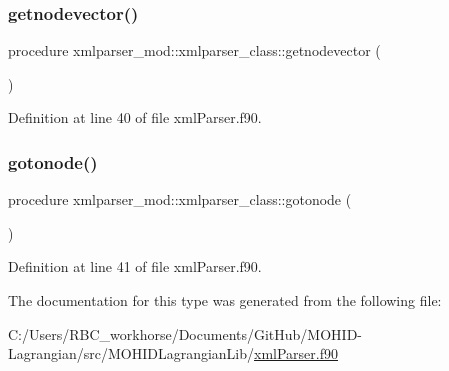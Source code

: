\subsubsection{\texorpdfstring{getnodevector()}{getnodevector()}}
{\footnotesize\ttfamily procedure xmlparser\+\_\+mod\+::xmlparser\+\_\+class\+::getnodevector (\begin{DoxyParamCaption}{ }\end{DoxyParamCaption})\hspace{0.3cm}{\ttfamily [private]}}



Definition at line 40 of file xml\+Parser.\+f90.

\mbox{\label{structxmlparser__mod_1_1xmlparser__class_ab8393d12a17d3409c136cdf29d0463b2}} 
\subsubsection{\texorpdfstring{gotonode()}{gotonode()}}
{\footnotesize\ttfamily procedure xmlparser\+\_\+mod\+::xmlparser\+\_\+class\+::gotonode (\begin{DoxyParamCaption}{ }\end{DoxyParamCaption})\hspace{0.3cm}{\ttfamily [private]}}



Definition at line 41 of file xml\+Parser.\+f90.



The documentation for this type was generated from the following file\+:\begin{DoxyCompactItemize}
\item 
C\+:/\+Users/\+R\+B\+C\+\_\+workhorse/\+Documents/\+Git\+Hub/\+M\+O\+H\+I\+D-\/\+Lagrangian/src/\+M\+O\+H\+I\+D\+Lagrangian\+Lib/\mbox{\hyperlink{xml_parser_8f90}{xml\+Parser.\+f90}}\end{DoxyCompactItemize}
